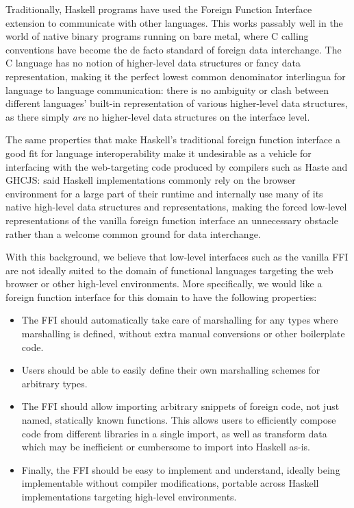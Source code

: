 \documentclass[preprint]{sigplanconf}
\begin{document}
Traditionally, Haskell programs have used the Foreign Function Interface
extension to communicate with other languages. This works
passably well in the world of native binary programs running on bare metal,
where C calling conventions have become the de facto standard of foreign
data interchange.
The C language has no notion of higher-level data structures or
fancy data representation, making it the perfect lowest common denominator
interlingua for language to language communication:
there is no ambiguity or clash between different languages' built-in
representation of various higher-level data structures, as there simply
\emph{are} no higher-level data structures on the interface level.

The same properties that make Haskell's traditional foreign function interface
a good fit for language interoperability make it undesirable as a vehicle for
interfacing with the web-targeting code produced by compilers such as Haste
and GHCJS: said Haskell implementations commonly rely on the browser environment
for a large part of their runtime and internally use many of its native
high-level data structures and representations, making the forced low-level
representations of the vanilla foreign function interface an unnecessary
obstacle rather than a welcome common ground for data interchange.

With this background, we believe that low-level interfaces such as the
vanilla FFI are not ideally suited to the domain of functional languages
targeting the web browser or other high-level environments.
More specifically, we would like a foreign function interface for this domain
to have the following properties:

\begin{itemize}
\item
  The FFI should automatically take care of marshalling for any types where
  marshalling is defined, without extra manual conversions or other
  boilerplate code.
\item
  Users should be able to easily define their own marshalling schemes for
  arbitrary types.
\item
  The FFI should allow importing arbitrary snippets of foreign code, not just
  named, statically known functions. This allows users to efficiently compose
  code from different libraries in a single import,
  as well as transform data which may be inefficient or cumbersome to import
  into Haskell as-is.
\item
  Finally, the FFI should be easy to implement and understand, ideally being
  implementable without compiler modifications, portable across Haskell
  implementations targeting high-level environments.
\end{itemize}
\end{document}
